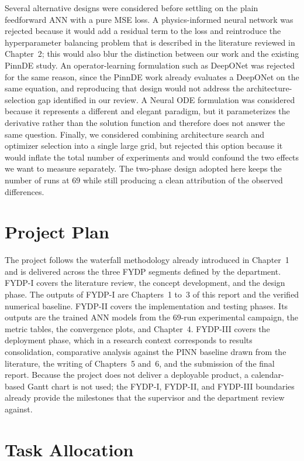 Several alternative designs were considered before settling on the plain feedforward ANN with a pure MSE loss. A physics-informed neural network was rejected because it would add a residual term to the loss and reintroduce the hyperparameter balancing problem that is described in the literature reviewed in Chapter~2; this would also blur the distinction between our work and the existing PinnDE study. An operator-learning formulation such as DeepONet was rejected for the same reason, since the PinnDE work already evaluates a DeepONet on the same equation, and reproducing that design would not address the architecture-selection gap identified in our review. A Neural ODE formulation was considered because it represents a different and elegant paradigm, but it parameterizes the derivative rather than the solution function and therefore does not answer the same question. Finally, we considered combining architecture search and optimizer selection into a single large grid, but rejected this option because it would inflate the total number of experiments and would confound the two effects we want to measure separately. The two-phase design adopted here keeps the number of runs at $69$ while still producing a clean attribution of the observed differences.

\section{Project Plan}

The project follows the waterfall methodology already introduced in Chapter~1 and is delivered across the three FYDP segments defined by the department. FYDP-I covers the literature review, the concept development, and the design phase. The outputs of FYDP-I are Chapters~1 to~3 of this report and the verified numerical baseline. FYDP-II covers the implementation and testing phases. Its outputs are the trained ANN models from the $69$-run experimental campaign, the metric tables, the convergence plots, and Chapter~4. FYDP-III covers the deployment phase, which in a research context corresponds to results consolidation, comparative analysis against the PINN baseline drawn from the literature, the writing of Chapters~5 and~6, and the submission of the final report. Because the project does not deliver a deployable product, a calendar-based Gantt chart is not used; the FYDP-I, FYDP-II, and FYDP-III boundaries already provide the milestones that the supervisor and the department review against.

\section{Task Allocation}

